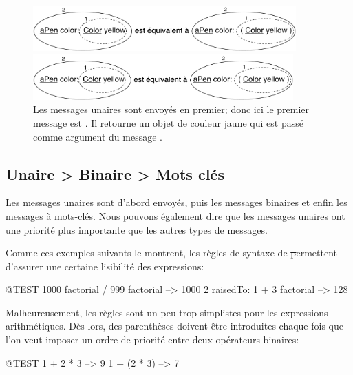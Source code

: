 \documentclass[a4paper,10pt,twoside]{book}
\begin{document}
\begin{figure}[ht]
\ifluluelse
	{\centerline{\includegraphics[width=0.9\textwidth]{uKeyUn}} }
	{\centerline{\includegraphics[width=10cm]{uKeyUn}} }
\caption{Les messages unaires sont envoy\'es en premier; donc ici le
  premier message est . Il retourne un objet de
  couleur jaune qui est pass\'e comme argument du message .\label{fig:uKeyUn}}
\end{figure}

\subsection*{Unaire > Binaire > Mots cl\'es}
Les messages unaires sont d'abord envoy\'es, puis les messages
binaires et enfin les messages \`a mots-cl\'es. Nous pouvons
\'egalement dire que les messages unaires ont une priorit\'e plus
importante que les autres types de messages.


Comme ces exemples suivants le montrent, les r\`egles de syntaxe de
\st permettent d'assurer une certaine lisibilit\'e des expressions:
\begin{code}{@TEST}
1000 factorial / 999 factorial --> 1000
2 raisedTo: 1 + 3 factorial     --> 128
\end{code}
\noindent

Malheureusement, les r\`egles sont un peu trop simplistes pour les
expressions arithm\'etiques. D\`es lors, des parenth\`eses doivent
\^etre introduites chaque fois que l'on veut imposer un ordre de
priorit\'e entre deux op\'erateurs binaires:
\begin{code}{@TEST}
1 + 2 * 3   --> 9
1 + (2 * 3) --> 7
\end{code}
\end{document}
